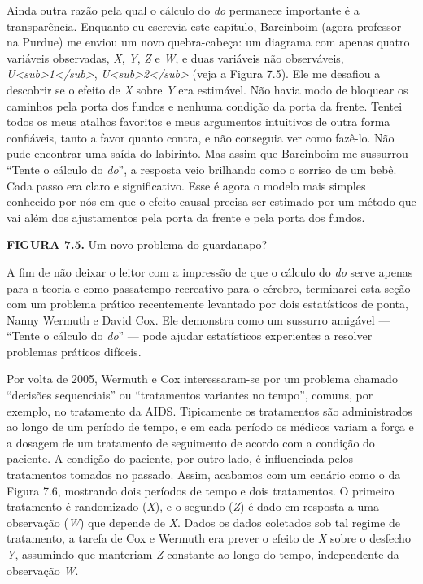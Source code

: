 \documentclass[11pt,a5paper,twoside]{book}
\begin{document}
Ainda outra razão pela qual o cálculo do \textit{do} permanece importante é a transparência. Enquanto eu escrevia este capítulo, Bareinboim (agora professor na Purdue) me enviou um novo quebra-cabeça: um diagrama com apenas quatro variáveis observadas, \textit{X}, \textit{Y}, \textit{Z} e \textit{W}, e duas variáveis não observáveis, \textit{U<sub>1</sub>}, \textit{U<sub>2</sub>} (veja a Figura 7.5). Ele me desafiou a descobrir se o efeito de \textit{X} sobre \textit{Y} era estimável. Não havia modo de bloquear os caminhos pela porta dos fundos e nenhuma condição da porta da frente. Tentei todos os meus atalhos favoritos e meus argumentos intuitivos de outra forma confiáveis, tanto a favor quanto contra, e não conseguia ver como fazê-lo. Não pude encontrar uma saída do labirinto. Mas assim que Bareinboim me sussurrou “Tente o cálculo do \textit{do}”, a resposta veio brilhando como o sorriso de um bebê. Cada passo era claro e significativo. Esse é agora o modelo mais simples conhecido por nós em que o efeito causal precisa ser estimado por um método que vai além dos ajustamentos pela porta da frente e pela porta dos fundos.

\textbf{FIGURA 7.5.} Um novo problema do guardanapo?

A fim de não deixar o leitor com a impressão de que o cálculo do \textit{do} serve apenas para a teoria e como passatempo recreativo para o cérebro, terminarei esta seção com um problema prático recentemente levantado por dois estatísticos de ponta, Nanny Wermuth e David Cox. Ele demonstra como um sussurro amigável — “Tente o cálculo do \textit{do}” — pode ajudar estatísticos experientes a resolver problemas práticos difíceis.

Por volta de 2005, Wermuth e Cox interessaram-se por um problema chamado “decisões sequenciais” ou “tratamentos variantes no tempo”, comuns, por exemplo, no tratamento da AIDS. Tipicamente os tratamentos são administrados ao longo de um período de tempo, e em cada período os médicos variam a força e a dosagem de um tratamento de seguimento de acordo com a condição do paciente. A condição do paciente, por outro lado, é influenciada pelos tratamentos tomados no passado. Assim, acabamos com um cenário como o da Figura 7.6, mostrando dois períodos de tempo e dois tratamentos. O primeiro tratamento é randomizado (\textit{X}), e o segundo (\textit{Z}) é dado em resposta a uma observação (\textit{W}) que depende de \textit{X}. Dados os dados coletados sob tal regime de tratamento, a tarefa de Cox e Wermuth era prever o efeito de \textit{X} sobre o desfecho \textit{Y}, assumindo que manteriam \textit{Z} constante ao longo do tempo, independente da observação \textit{W}.
\end{document}
